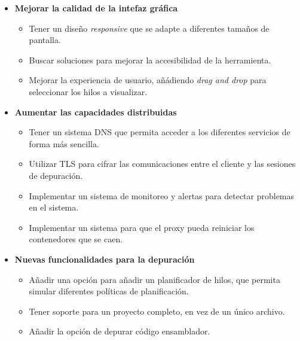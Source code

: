 \begin{itemize}
    \item \textbf{Mejorar la calidad de la intefaz gráfica}
    \begin{itemize}
        \item Tener un diseño \textit{responsive} que se adapte a diferentes tamaños de pantalla.
        \item Buscar soluciones para mejorar la accesibilidad de la herramienta.
        \item Mejorar la experiencia de usuario, añádiendo \textit{drag and drop} para seleccionar los hilos a visualizar.
    \end{itemize}
    \item \textbf{Aumentar las capacidades distribuidas}
    \begin{itemize}
        \item Tener un sistema DNS que permita acceder a los diferentes servicios de forma más sencilla.
        \item Utilizar TLS para cifrar las comunicaciones entre el cliente y las sesiones de depuración.
        \item Implementar un sistema de monitoreo y alertas para detectar problemas en el sistema.
        \item Implementar un sistema para que el proxy pueda reiniciar los contenedores que se caen.
    \end{itemize}
    \item \textbf{Nuevas funcionalidades para la depuración}
    \begin{itemize}
        \item Añadir una opción para añadir un planificador de hilos, que permita simular diferentes políticas de planificación.
        \item Tener soporte para un proyecto completo, en vez de un único archivo.
        \item Añadir la opción de depurar código ensamblador.
    \end{itemize}
\end{itemize}
